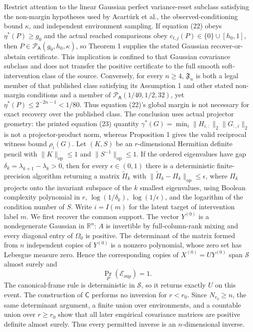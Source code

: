 Restrict attention to the linear Gaussian perfect variance-reset subclass satisfying the non-margin hypotheses used by Acartürk et al., the observed-conditioning bound \(\kappa\), and independent environment sampling. If equation (22) obeys \(\eta^{\ast}(P)\ge g_0\) and the actual reached comparisons obey \(c_{t,j}(P)\in\{0\}\cup[h_0,1]\), then \(P\in\mathcal P_{\mathsf A}(g_0,h_0,\kappa)\), so Theorem 1 supplies the stated Gaussian recover-or-abstain certificate. This implication is confined to that Gaussian covariance subclass and does not transfer the positive certificate to the full smooth soft-intervention class of the source. Conversely, for every \(n\ge4\), \(\mathfrak F_n\) is both a legal member of that published class satisfying its Assumption 1 and other stated non-margin conditions and a member of \(\mathcal P_{\mathsf A}(1/40,1/2,32)\), yet \(\eta^{\ast}(P)\le2^{-2n-1}<1/80\). Thus equation (22)'s global margin is not necessary for exact recovery over the published class. The conclusion uses actual projector geometry: the printed equation (23) quantity \(\gamma^{\ast}(G)=\min_i\|H_{i,:}\|_2\|G_{:,i}\|_2\) is not a projector-product norm, whereas Proposition 1 gives the valid reciprocal witness bound \(\rho_i(G)\).
Let \((K,S)\) be an \(r\)-dimensional Hermitian definite pencil with \(\|K\|_{\mathrm{op}}\le1\) and \(\|S^{-1}\|_{\mathrm{op}}\le1\). If the ordered eigenvalues have gap \(\delta_k=\lambda_{k+1}-\lambda_k>0\), then for every \(\epsilon\in(0,1)\) there is a deterministic finite-precision algorithm returning a matrix \(\widetilde\Pi_k\) with \(\|\widetilde\Pi_k-\Pi_k\|_{\mathrm{op}}\le\epsilon\), where \(\Pi_k\) projects onto the invariant subspace of the \(k\) smallest eigenvalues, using Boolean complexity polynomial in \(r\), \(\log(1/\delta_k)\), \(\log(1/\epsilon)\), and the logarithm of the condition number of \(S\).
Write \(i=I(m)\) for the latent target of intervention label \(m\).  We first recover the common support.  The vector \(Y^{(0)}\) is a nondegenerate Gaussian in \(\mathbb R^n\): \(A\) is invertible by full-column-rank mixing and every diagonal entry of \(\Omega_0\) is positive.  The determinant of the matrix formed from \(n\) independent copies of \(Y^{(0)}\) is a nonzero polynomial, whose zero set has Lebesgue measure zero.  Hence the corresponding copies of \(X^{(0)}=UY^{(0)}\) span \(\mathcal S\) almost surely and
\[
 \Pr_P(\mathcal E_{\mathrm{sup}})=1.
\]
The canonical-frame rule is deterministic in \(\mathcal S\), so it returns exactly \(U\) on this event.  The construction of \(\mathsf C\) performs no inversion for \(r<r_0\).  Since \(N_{r_0}\ge n\), the same determinant argument, a finite union over environments, and a countable union over \(r\ge r_0\) show that all later empirical covariance matrices are positive definite almost surely.  Thus every permitted inverse is an \(n\)-dimensional inverse.

